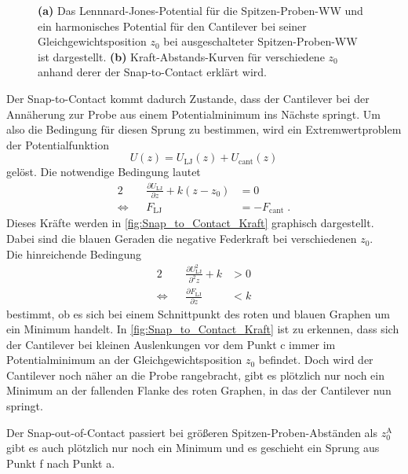 \begin{figure}
\begin{subfigure}{0.49\textwidth}
            \caption{}
            \label{fig:Snap_to_Contact_Kraft}
        \end{subfigure}
        \caption{\textbf{(a)} Das Lennnard-Jones-Potential für die Spitzen-Proben-WW und ein harmonisches Potential für den Cantilever bei seiner Gleichgewichtsposition $z_0$ bei ausgeschalteter Spitzen-Proben-WW ist dargestellt. \textbf{(b)} Kraft-Abstands-Kurven für verschiedene $z_0$ anhand derer der Snap-to-Contact erklärt wird.}
        \label{fig:Snap_to_Contact}
    \end{figure}
    \FloatBarrier
    Der Snap-to-Contact kommt dadurch Zustande, dass der Cantilever bei der Annäherung zur Probe aus einem Potentialminimum ins Nächste springt.
    Um also die Bedingung für diesen Sprung zu bestimmen, wird ein Extremwertproblem der Potentialfunktion
    \begin{equation}
        U(z) = U_{\mathrm{LJ}}(z) + U_{\mathrm{cant}}(z)
    \end{equation}
    gelöst. Die notwendige Bedingung lautet
    \begin{alignat}{2}
        && \frac{\partial U_{\mathrm{LJ}}}{\partial z} + k(z - z_0) &= 0 \nonumber\\
        \Leftrightarrow && F_{\mathrm{LJ}} &= -F_{\mathrm{cant}} \;.
    \end{alignat}
    Dieses Kräfte werden in \autoref{fig:Snap_to_Contact_Kraft} graphisch dargestellt.
    Dabei sind die blauen Geraden die negative Federkraft bei verschiedenen $z_0$. \\
    Die hinreichende Bedingung
    \begin{alignat}{2}
        && \frac{\partial U_{\mathrm{LJ}}^2}{\partial^2 z} + k &> 0 \nonumber\\[3pt]
        \Leftrightarrow && \frac{\partial F_{\mathrm{LJ}}}{\partial z} &< k
    \end{alignat}
    bestimmt, ob es sich bei einem Schnittpunkt des roten und blauen Graphen um ein Minimum handelt.
    In \autoref{fig:Snap_to_Contact_Kraft} ist zu erkennen, dass sich der Cantilever bei kleinen Auslenkungen vor dem Punkt c immer im Potentialminimum an der Gleichgewichtsposition $z_0$ befindet.
    Doch wird der Cantilever noch näher an die Probe rangebracht, gibt es plötzlich nur noch ein Minimum an der fallenden Flanke des roten Graphen, in das der Cantilever nun springt.

    Der Snap-out-of-Contact passiert bei größeren Spitzen-Proben-Abständen als $z_0^{\mathrm{A}}$ gibt es auch plötzlich nur noch ein Minimum und es geschieht ein Sprung aus Punkt f nach Punkt a.

